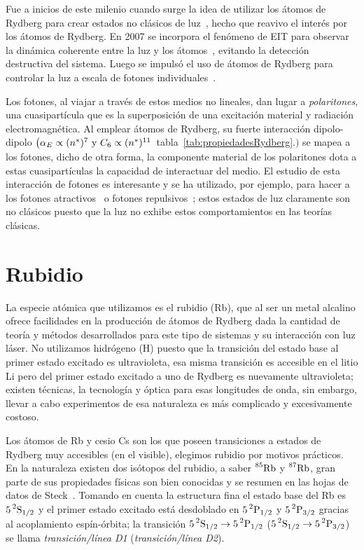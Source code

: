 \p Fue a inicios de este milenio cuando surge la idea de utilizar los átomos de Rydberg para crear estados no clásicos de luz~\cite{lukin2}, hecho que reavivo el interés por los átomos de Rydberg. En 2007 se incorpora el fenómeno de EIT para observar la dinámica coherente entre la luz y los átomos~\cite{mohapatra}, evitando la detección destructiva del sistema. Luego se impulsó el uso de átomos de Rydberg para controlar la luz a escala de fotones individuales~\cite{dudin,peyronel,maxwell}.

\p Los fotones, al viajar a través de estos medios no lineales, dan lugar a \emph{polaritones}, una cuasipartícula que es la superposición de una excitación material y radiación electromagnética. Al emplear átomos de Rydberg, su fuerte interacción dipolo-dipolo $\bigl(\alpha_{E}\propto(n^{*})^{7}\text{ y }C_{6}\propto(n^{*})^{11}\bigr.$~tabla~\ref{tab:propiedadesRydberg}$\bigl.\bigr)$ se mapea a los fotones, dicho de otra forma, la componente material de los polaritones dota a estas cuasipartículas la capacidad de interactuar del medio. El estudio de esta interacción de fotones es interesante y se ha utilizado, por ejemplo, para hacer a los fotones atractivos~\cite{firstenberg2} o fotones repulsivos~\cite{cantu}; estos estados de luz claramente son no clásicos puesto que la luz no exhibe estos comportamientos en las teorías clásicas.

\section{\label{sec:rubidio}Rubidio}

La especie atómica que utilizamos es el rubidio (Rb), que al ser un metal alcalino ofrece facilidades en la producción de átomos de Rydberg dada la cantidad de teoría y métodos desarrollados para este tipo de sistemas y su interacción con luz láser. No utilizamos hidrógeno (H) puesto que la transición del estado base al primer estado excitado es ultravioleta, esa misma transición es accesible en el litio Li pero del primer estado excitado a uno de Rydberg es nuevamente ultravioleta; existen técnicas, la tecnología y óptica para esas longitudes de onda, sin embargo, llevar a cabo experimentos de esa naturaleza es más complicado y excesivamente costoso.

\p Los átomos de Rb y cesio Cs son los que poseen transiciones a estados de Rydberg muy accesibles (en el visible), elegimos rubidio por motivos prácticos. En la naturaleza existen dos isótopos del rubidio, a saber $\prescript{85}{}{\mathrm{Rb}}$ y $\prescript{87}{}{\mathrm{Rb}}$, gran parte de sus propiedades físicas son bien conocidas y se resumen en las hojas de datos de Steck~\cite{rb85,rb87}. Tomando en cuenta la estructura fina el estado base del Rb es $5\prescript{2}{}{\mathrm{S}}_{1/2}$ y el primer estado excitado está desdoblado en $5\prescript{2}{}{\mathrm{P}}_{1/2}$ y $5\prescript{2}{}{\mathrm{P}}_{3/2}$ gracias al acoplamiento espín-órbita; la transición $5\prescript{2}{}{\mathrm{S}}_{1/2}\to5\prescript{2}{}{\mathrm{P}}_{1/2}$ ($5\prescript{2}{}{\mathrm{S}}_{1/2}\to5\prescript{2}{}{\mathrm{P}}_{3/2}$) se llama \emph{transición/línea D1} (\emph{transición/línea D2}).

